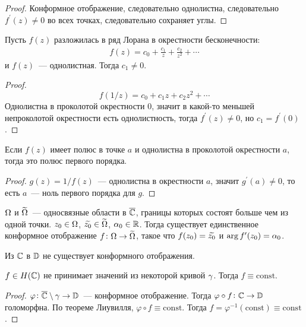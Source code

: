 \begin{proof}
    Конформное отображение, следовательно однолистна,
    следовательно $f^\prime(z) \ne 0$ во всех точках,
    следовательно сохраняет углы.
\end{proof}

\begin{consequence}
    Пусть $f(z)$ разложилась в ряд Лорана
    в окрестности бесконечности: 
    \begin{gather*}
        f(z) = c_0 + \frac{c_1}{z} + \frac{c_2}{z^2} + \cdots
    \end{gather*}
    и $f(z)$~--- однолистная.
    Тогда $c_1 \ne 0$.
\end{consequence}

\begin{proof}
    $$f(1/z) = c_0 + c_1z + c_2z^2 + \cdots$$
    Однолистна в проколотой окрестности $0$,
    значит в какой-то меньшей непроколотой окрестности
    есть однолистность, тогда $f^\prime(z) \ne 0$,
    но $c_1 = f^\prime(0)$.
\end{proof}

\begin{consequence}
    Если $f(z)$ имеет полюс в точке $a$ и однолистна
    в проколотой окрестности $a$, тогда это полюс первого порядка.
\end{consequence}

\begin{proof}
    $g(z) = 1/f(z)$~--- однолистна в окрестности
    $a$, значит $g^\prime(a) \ne 0$, то есть $a$~--- ноль первого порядка
    для $g$.
\end{proof}

\begin{theorem}
    $\Omega$ и $\widetilde{\Omega}$~--- односвязные области в $\overline{\mathbb{C}}$, границы
    которых состоят больше чем из одной точки.
    $z_0 \in \Omega$, $\widetilde{z_0} \in \widetilde{\Omega}$, $\alpha_0 \in \mathbb{R}$.
    Тогда существует единственное конформное отображение
    $f \colon \Omega \to \widetilde{\Omega}$, такое что $f(z_0) = \widetilde{z_0}$
    и $\arg f^\prime(z_0) = \alpha_0$.
\end{theorem}

\example \; Из $\mathbb{C}$ в $\mathbb{D}$ не существует конформного отображения. 

\begin{consequence}
    $f \in H(\mathbb{C})$ не принимает значений из некоторой кривой $\gamma$.
    Тогда $f \equiv \mathrm{const}$.
\end{consequence}

\begin{proof}
    $\varphi\colon \overline{\mathbb{C}}\setminus\gamma\to\mathbb{D}$~--- конформное отображение.
    Тогда $\varphi \circ f\colon \mathbb{C} \to \mathbb{D}$ голоморфна.
    По теореме Лиувилля, $\varphi \circ f \equiv \mathrm{const}$.
    Тогда $f = \varphi^{-1}(\mathrm{const}) \equiv \mathrm{const}$.
\end{proof}

\newpage

